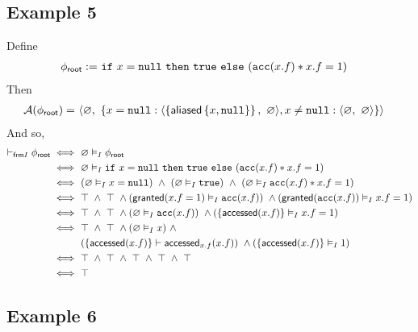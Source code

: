 \newpage
\subsection*{Example 5}

Define
\begin{align*}
{\phi_\textsf{root}} := & \
\texttt{if} \ x = \texttt{null} \ \texttt{then} \ \texttt{true} \ \texttt{else} \ (\texttt{acc}(x.f) \ast x.f = 1)
\end{align*}
Then
\begin{align*}
\mathcal{A}({\phi_\textsf{root}}) = & \
\langle \varnothing ,\ \left\{ 
  x = \texttt{null}: \langle \left\{  \textsf{aliased}\left\{ x, \texttt{null} \right\}  \right\} ,\ \varnothing \rangle,
  x \neq \texttt{null}: \langle \varnothing ,\ \varnothing \rangle
 \right\} \rangle
\end{align*}
And so,
\begin{align*}
\vdash_{\textsf{frm}I} {\phi_\textsf{root}}
\iff & \
\varnothing \vDash_I {\phi_\textsf{root}}
\\ \iff & \
  \varnothing
  \vDash_I
  \texttt{if} \ x = \texttt{null} \ \texttt{then} \ \texttt{true} \ \texttt{else} \ (\texttt{acc}(x.f) \ast x.f = 1)
\\ \iff & \
  (\varnothing \vDash_I x = \texttt{null}) \ \land \
  (\varnothing \vDash_I \texttt{true}) \ \land \
  (\varnothing \vDash_I \texttt{acc}(x.f) \ast x.f = 1)
\\ \iff & \
  \top \ \land \ \top \ \land
  ( \textsf{granted}(x.f = 1) \vDash_I \texttt{acc}(x.f) ) \ \land
  ( \textsf{granted}(\texttt{acc}(x.f)) \vDash_I x.f = 1 )
\\ \iff & \
  \top \ \land \ \top \ \land
  ( \varnothing \vDash_I \texttt{acc}(x.f) ) \ \land
  ( \left\{  \textsf{accessed}(x.f)  \right\} \vDash_I x.f = 1 )
\\ \iff & \
  \top \ \land \ \top \ \land
  ( \varnothing \vDash_I x ) \ \land \\ & \
  ( \left\{  \textsf{accessed}(x.f)  \right\} \vdash \textsf{accessed}_{x.f}(x.f) ) \ \land
  ( \left\{  \textsf{accessed}(x.f)  \right\} \vDash_I 1 )
\\ \iff & \
  \top \ \land \ \top \ \land \
  \top \ \land \ \top \ \land \
  \top
\\ \iff & \
  \top
\end{align*}

\newpage
\subsection*{Example 6}

